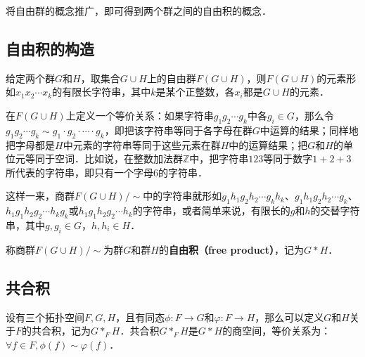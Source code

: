 
将自由群的概念推广，即可得到两个群之间的自由积的概念．

\subsection{自由积的构造}

给定两个群$G$和$H$，取集合$G\cup H$上的自由群$F(G\cup H)$，则$F(G\cup H)$的元素形如$x_1x_2\cdots x_k$的有限长字符串，其中$k$是某个正整数，各$x_i$都是$G\cup H$的元素．

在$F(G\cup H)$上定义一个等价关系：如果字符串$g_1g_2\cdots g_k$中各$g_i\in G$，那么令$g_1g_2\cdots g_k\sim g_1\cdot g_2\cdot\cdots\cdot g_k$，即把该字符串等同于各字母在群$G$中运算的结果；同样地把字母都是$H$中元素的字符串等同于这些元素在群$H$中的运算结果；把$G$和$H$的单位元等同于空词．比如说，在整数加法群$\mathbb{Z}$中，把字符串$123$等同于数字$1+2+3$所代表的字符串，即只有一个字母$6$的字符串．

这样一来，商群$F(G\cup H)/\sim$中的字符串就形如$g_1h_1g_2h_2\cdots g_kh_k$、$g_1h_1g_2h_2\cdots g_k$、$h_1g_1h_2g_2\cdots h_kg_k$或$h_1g_1h_2g_2\cdots h_k$的字符串，或者简单来说，有限长的$g$和$h$的交替字符串，其中$g, g_i\in G$，$h, h_i\in H$．

称商群$F(G\cup H)/\sim$为群$G$和群$H$的\textbf{自由积（free product）}，记为$G*H$．

\subsection{共合积}

设有三个拓扑空间$F, G, H$，且有同态$\phi:F\rightarrow G$和$\varphi:F\rightarrow H$，那么可以定义$G$和$H$关于$F$的共合积，记为$G*_FH$．共合积$G*_FH$是$G*H$的商空间，等价关系为：$\forall f\in F, \phi(f)\sim\varphi(f)$．


